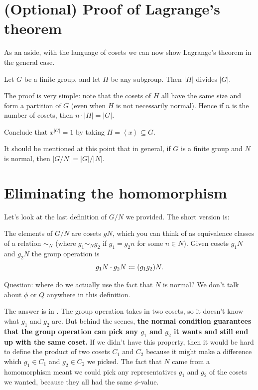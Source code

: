 \section{(Optional) Proof of Lagrange's theorem}
As an aside, with the language of cosets
we can now show Lagrange's theorem in the general case.
\begin{theorem}
	\label{thm:lagrange_grp}
	Let $G$ be a finite group, and let $H$ be any subgroup.
	Then $\left\lvert H \right\rvert$ divides $\left\lvert G \right\rvert$.
\end{theorem}

The proof is very simple: note that the cosets of $H$
all have the same size and form a partition of $G$
(even when $H$ is not necessarily normal).
Hence if $n$ is the number of cosets,
then $n \cdot \left\lvert H \right\rvert = \left\lvert G \right\rvert$.

\begin{ques}
	Conclude that $x^{\left\lvert G \right\rvert}=1$
	by taking $H = \left<x\right> \subseteq G$.
\end{ques}

\begin{remark}
	It should be mentioned at this point that
	in general, if $G$ is a finite group and $N$ is normal,
	then $|G/N| = |G| / |N|$.
\end{remark}

\section{Eliminating the homomorphism}
Let's look at the last definition of $G/N$ we provided.
The short version is:
\begin{itemize}
	\ii The elements of $G/N$ are cosets $gN$, which you can think
	of as equivalence classes of a relation $\sim_N$
	(where $g_1 \sim_N g_2$ if $g_1 = g_2n$ for some $n \in N$).
	\ii Given cosets $g_1N$ and $g_2N$ the group operation is
	\[ g_1N \cdot g_2N \coloneqq (g_1g_2)N. \]
\end{itemize}
Question: where do we actually use the fact that $N$ is normal?
We don't talk about $\phi$ or $Q$ anywhere in this definition.

The answer is in .
The group operation takes in two cosets,
so it doesn't know what $g_1$ and $g_2$ are.
But behind the scenes,
\textbf{the normal condition guarantees that the group operation can pick
any $g_1$ and $g_2$ it wants and still end up with the same coset.}
If we didn't have this property, then it would be hard to define the
product of two cosets $C_1$ and $C_2$ because it might make a difference
which $g_1 \in C_1$ and $g_2 \in C_2$ we picked.
The fact that $N$ came from a homomorphism meant we could pick any representatives
$g_1$ and $g_2$ of the cosets we wanted, because they all had the same $\phi$-value.

